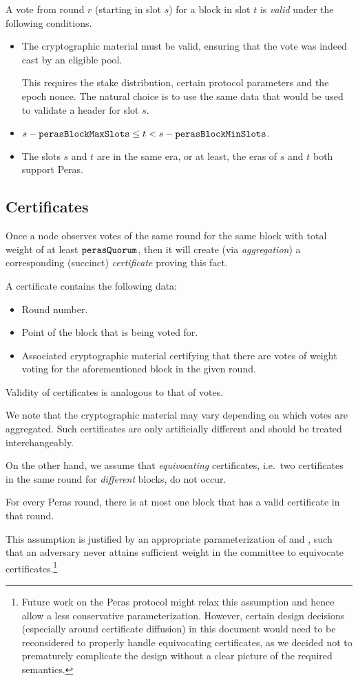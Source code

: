 A vote from round $r$ (starting in slot $s$) for a block in slot $t$ is \emph{valid} under the following conditions.
\begin{itemize}
\item
  The cryptographic material must be valid, ensuring that the vote was indeed cast by an eligible pool.

  This requires the stake distribution, certain protocol parameters and the epoch nonce.
  The natural choice is to use the same data that would be used to validate a header for slot $s$.
\item
  $s - \mathtt{perasBlockMaxSlots} \le t < s - \mathtt{perasBlockMinSlots}$.
\item
  The slots $s$ and $t$ are in the same era, or at least, the eras of $s$ and $t$ both support Peras.
\end{itemize}

\subsection{Certificates}\label{sec:certificate generalities}

Once a node observes votes of the same round for the same block with total weight of at least $\mathtt{perasQuorum}$, then it will create (via \emph{aggregation}) a corresponding (succinct) \emph{certificate} proving this fact.

A certificate contains the following data:
\begin{itemize}
\item Round number.
\item Point of the block that is being voted for.
\item Associated cryptographic material certifying that there are votes of weight \perasQuorum{} voting for the aforementioned block in the given round.
\end{itemize}

Validity of certificates is analogous to that of votes.

We note that the cryptographic material may vary depending on which votes are aggregated.
Such certificates are only artificially different and should be treated interchangeably.

On the other hand, we assume that \emph{equivocating} certificates, i.e.\ two certificates in the same round for \emph{different} blocks, do not occur.
\begin{tcolorbox}[title=Assumption]
  For every Peras round, there is at most one block that has a valid certificate in that round.
\end{tcolorbox}
This assumption is justified by an appropriate parameterization of \perasQuorum{} and \perasN{}, such that an adversary never attains sufficient weight in the committee to equivocate certificates.\footnote{Future work on the Peras protocol might relax this assumption and hence allow a less conservative parameterization.
  However, certain design decisions (especially around certificate diffusion) in this document would need to be reconsidered to properly handle equivocating certificates, as we decided not to prematurely complicate the design without a clear picture of the required semantics.}

